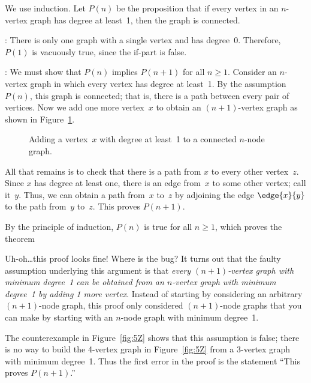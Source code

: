 \begin{bogusproof}
We use induction.  Let $P(n)$ be the proposition that if every vertex
in an $n$-vertex graph has degree at least~1, then the graph is
connected.

: There is only one graph with a single
vertex and has degree~0.  Therefore, $P(1)$ is vacuously true, since
the if-part is false.

: We must show that $P(n)$ implies
$P(n+1)$ for all $n \ge 1$.  Consider an $n$-vertex graph in which
every vertex has degree at least~1.  By the assumption~$P(n)$, this
graph is connected; that is, there is a path between every pair of
vertices.  Now we add one more vertex~$x$ to obtain an $(n+1)$-vertex
graph as shown in Figure~\ref{fig:5Y}.

\begin{figure}


\caption{Adding a vertex~$x$ with degree at least~1 to a connected
  $n$-node graph.}

\label{fig:5Y}

\end{figure}

All that remains is to check that there is a path from $x$ to every
other vertex~$z$.  Since $x$ has degree at least one, there is an edge
from~$x$ to some other vertex; call it~$y$.  Thus, we can obtain a
path from~$x$ to~$z$ by adjoining the edge $\edge{x}{y}$ to the path
from~$y$ to~$z$.  This proves $P(n + 1)$.

By the principle of induction, $P(n)$ is true for all  $n \ge 1$,
which proves the theorem
\end{bogusproof}

Uh-oh\dots this proof looks fine!  Where is the bug?  It turns out
that the faulty assumption underlying this argument is that
\emph{every $(n + 1)$-vertex graph with minimum degree~1 can be
obtained from an $n$-vertex graph with minimum degree~1 by adding 1
more vertex}.  Instead of starting by considering an arbitrary $(n +
1)$-node graph, this proof only considered $(n + 1)$-node graphs
that you can make by starting with an $n$-node graph with minimum
degree~1.

The counterexample in Figure~\ref{fig:5Z} shows that this assumption
is false; there is no way to build the 4-vertex graph in
Figure~\ref{fig:5Z} from a 3-vertex graph with minimum degree~1.
Thus the first error in the proof is the statement ``This proves
$P(n + 1)$.''

